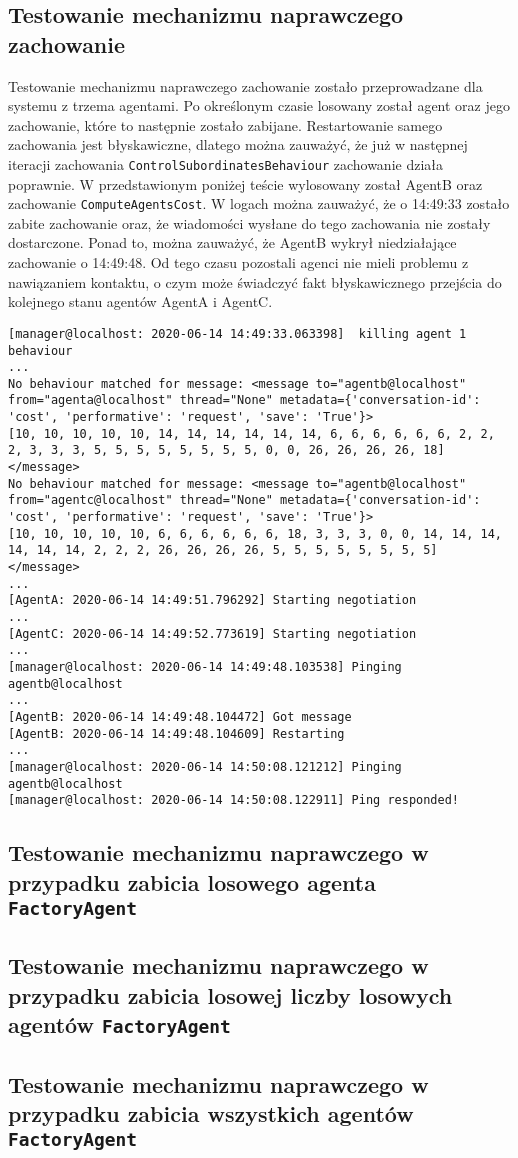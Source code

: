\subsection{Testowanie mechanizmu naprawczego zachowanie}
Testowanie mechanizmu naprawczego zachowanie zostało przeprowadzane dla systemu z trzema agentami. Po określonym czasie losowany został agent oraz jego zachowanie, które to następnie zostało zabijane. Restartowanie samego zachowania jest błyskawiczne, dlatego można zauważyć, że już w następnej iteracji zachowania \texttt{ControlSubordinatesBehaviour} zachowanie działa poprawnie. W przedstawionym poniżej teście wylosowany został AgentB oraz zachowanie \texttt{ComputeAgentsCost}. W logach można zauważyć, że o 14:49:33 zostało zabite zachowanie oraz, że wiadomości wysłane do tego zachowania nie zostały dostarczone. Ponad to, można zauważyć, że AgentB wykrył niedziałające zachowanie o 14:49:48. Od tego czasu pozostali agenci nie mieli problemu z nawiązaniem kontaktu, o czym może świadczyć fakt błyskawicznego przejścia do kolejnego stanu agentów AgentA i AgentC.
\begin{lstlisting}
[manager@localhost: 2020-06-14 14:49:33.063398]  killing agent 1 behaviour 
...
No behaviour matched for message: <message to="agentb@localhost" from="agenta@localhost" thread="None" metadata={'conversation-id': 'cost', 'performative': 'request', 'save': 'True'}>
[10, 10, 10, 10, 10, 14, 14, 14, 14, 14, 14, 6, 6, 6, 6, 6, 6, 2, 2, 2, 3, 3, 3, 5, 5, 5, 5, 5, 5, 5, 5, 0, 0, 26, 26, 26, 26, 18]
</message>
No behaviour matched for message: <message to="agentb@localhost" from="agentc@localhost" thread="None" metadata={'conversation-id': 'cost', 'performative': 'request', 'save': 'True'}>
[10, 10, 10, 10, 10, 6, 6, 6, 6, 6, 6, 18, 3, 3, 3, 0, 0, 14, 14, 14, 14, 14, 14, 2, 2, 2, 26, 26, 26, 26, 5, 5, 5, 5, 5, 5, 5, 5]
</message>
...
[AgentA: 2020-06-14 14:49:51.796292] Starting negotiation
...
[AgentC: 2020-06-14 14:49:52.773619] Starting negotiation
...
[manager@localhost: 2020-06-14 14:49:48.103538] Pinging agentb@localhost
...
[AgentB: 2020-06-14 14:49:48.104472] Got message
[AgentB: 2020-06-14 14:49:48.104609] Restarting
...
[manager@localhost: 2020-06-14 14:50:08.121212] Pinging agentb@localhost
[manager@localhost: 2020-06-14 14:50:08.122911] Ping responded!
\end{lstlisting}
\subsection{Testowanie mechanizmu naprawczego w przypadku zabicia losowego agenta \texttt{FactoryAgent}}

\subsection{Testowanie mechanizmu naprawczego w przypadku zabicia losowej liczby losowych agentów \texttt{FactoryAgent}}

\subsection{Testowanie mechanizmu naprawczego w przypadku zabicia wszystkich agentów \texttt{FactoryAgent}}